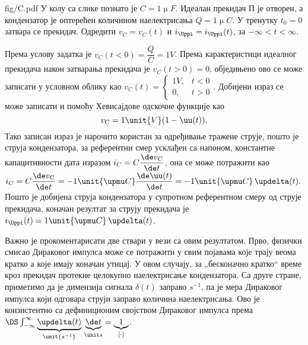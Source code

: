 \noindent\mnImportant
\begin{slikaDesno}[0.833]{fig/C.pdf}\noindent
\PID \label{ID:capID}
У колу са слике познато је 
$C = 1 \unit{\upmu F}$. 
Идеалан прекидач П је отворен, а кондензатор је оптерећен количином
наелектрисања $Q = 1 \unit{\upmu C}$. У тренутку $t_0 = 0$ затвара се прекидач. 
Одредити $v_{C} = v_{C}(t)$        
и $i_{\Uppi} = i_{\Uppi}(t)$, за $-\infty < t < \infty$. 
\end{slikaDesno}

\REZULTAT 
Према услову задатка је 
\vspace{1mm}
$v_C(t < 0) = \dfrac{Q}{C} = 1\unit{V}$. Према карактеристици идеалног прекидача
након затварања прекидача је $v_C(t > 0) = 0$, обједињено ово се може записати у условном облику као 
$
v_C(t) = 
\begin{cases}
        1\unit{V},&  t < 0 \\
        0,        &  t > 0
\end{cases}.
$ Добијени израз се може записати и помоћу Хевисајдове одскочне функције као 
\begin{equation}
v_{\rm C} = 1\unit{V} ( 1 - \uu(t) ). 
\end{equation}
Тако записан израз је нарочито користан за одређивање тражене струје, пошто је струја кондензатора, 
за референтни смер усклађен са напоном, 
константне капацитивности дата изразом $i_C = C\dfrac{\de v_C}{\de t}$, она се може потражити као
$
i_C = C \dfrac{\de v_{\rm C}}{\de t} = - 1\unit{\upmu C} \dfrac{\de \uu(t)}{\de t}  = 
- 1\unit{\upmu C} \, \updelta(t). 
$
Пошто је добијена струја кондензатора у супротном референтном смеру од струје прекидача, коначан 
резултат за струју прекидача је 
$i_{\Uppi}(t) = 1\unit{\upmu C} \, \updelta(t)$.

Важно је прокоментарисати две ствари у вези са овим резултатом. Прво, физички смисао Дираковог импулса може
се потражити у свим појавама које трају веома кратко а које имају коначан утицај. У овом случају, 
за „бесконачно кратко“ време кроз прекидач протекне целокупно наелектрисање кондензатора. Са друге 
стране, приметимо да је димензија сигнала $\delta(t)$ заправо $\unit{s^{-1}}$, па је мера Дираковог импулса
који одговара струји заправо количина наелектрисања. Ово је конзистентно са дефиниционим својством
Дираковог импулса према $\DS \int_{-\infty}^{\infty} 
\underbrace{\updelta(t)}_{\unit{s^{-1}}} \, 
\underbrace{\de t}_{\unit s} = \underbrace{1}_{[\cdot]}$.